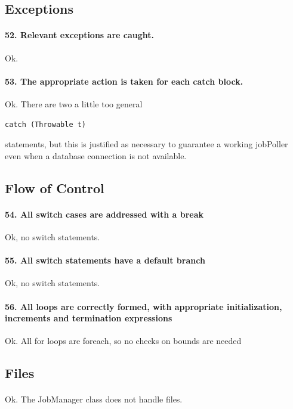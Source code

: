 \documentclass[english]{article}
\begin{document}
\subsection{Exceptions}

\paragraph{52. Relevant exceptions are caught.}
Ok.
\paragraph{53. The appropriate action is taken for each catch block.}
Ok. There are two a little too general
\begin{lstlisting}
catch (Throwable t)
\end{lstlisting} statements, but this is justified as necessary to guarantee a working jobPoller even when a database connection is not available.

\subsection{Flow of Control}
\paragraph{54. All switch cases are addressed with a break}
Ok, no switch statements.

\paragraph{55. All switch statements have a default branch}
Ok, no switch statements.

\paragraph{56. All loops are correctly formed, with appropriate initialization, increments and termination expressions}
Ok.
All for loops are foreach, so no checks on bounds are needed

\subsection{Files}
\paragraph{}
Ok.
The JobManager class does not handle files.
\end{document}
